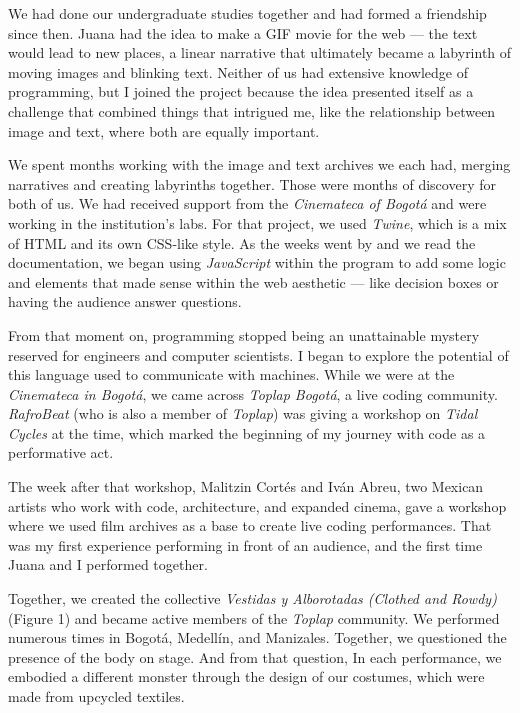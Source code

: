 \documentclass[12pt, twoside, a4paper]{report}
\begin{document}
We had done our undergraduate studies together and had formed a friendship since then.
 Juana had the idea to make a GIF movie for the web — the text would lead to new places, 
 a linear narrative that ultimately became a labyrinth of moving images and blinking text. 
 Neither of us had extensive knowledge of programming, but I joined the project because the idea presented itself as a challenge that combined things that intrigued me, like the relationship between image and text, where both are equally important.

We spent months working with the image and text archives we each had, merging narratives and creating 
labyrinths together. Those were months of discovery for both of us. We had received support
 from the \textit{Cinemateca of Bogotá} and were working in the institution’s labs. For that project, we used \textit{Twine}, which is a mix of HTML and its own CSS-like style. As the weeks went by and we read the documentation, we began using \textit{JavaScript} within the program to add some logic and elements that made sense within the web aesthetic — like decision boxes or having the audience answer questions.

From that moment on, programming stopped being an unattainable mystery reserved for engineers and computer scientists. I began to explore the potential of this language used to communicate with machines. While we were at the\textit{ Cinemateca in Bogotá}, we came across \textit{Toplap Bogotá}, a live coding community. \textit{RafroBeat} (who is also a member of \textit{Toplap}) was giving a workshop on \textit{Tidal Cycles} at the time, which marked the beginning of my journey with code as a performative act.

The week after that workshop, Malitzin Cortés and Iván Abreu, two Mexican artists who work with code, architecture,
 and expanded cinema, gave a workshop where we used film archives as a 
 base to create live coding performances. 
 That was my first experience performing in front of an audience, and the first time Juana and I performed together.

Together, we created the collective \textit{Vestidas y Alborotadas (Clothed and Rowdy)} (Figure 1)
 and became active members of the \textit{Toplap} community. We performed numerous times in Bogotá, Medellín, and Manizales. 
 Together, we questioned the presence of the body on stage. And from that question,
In each performance, we embodied a different monster through the design of our costumes, 
which were made from upcycled textiles. 
\end{document}
